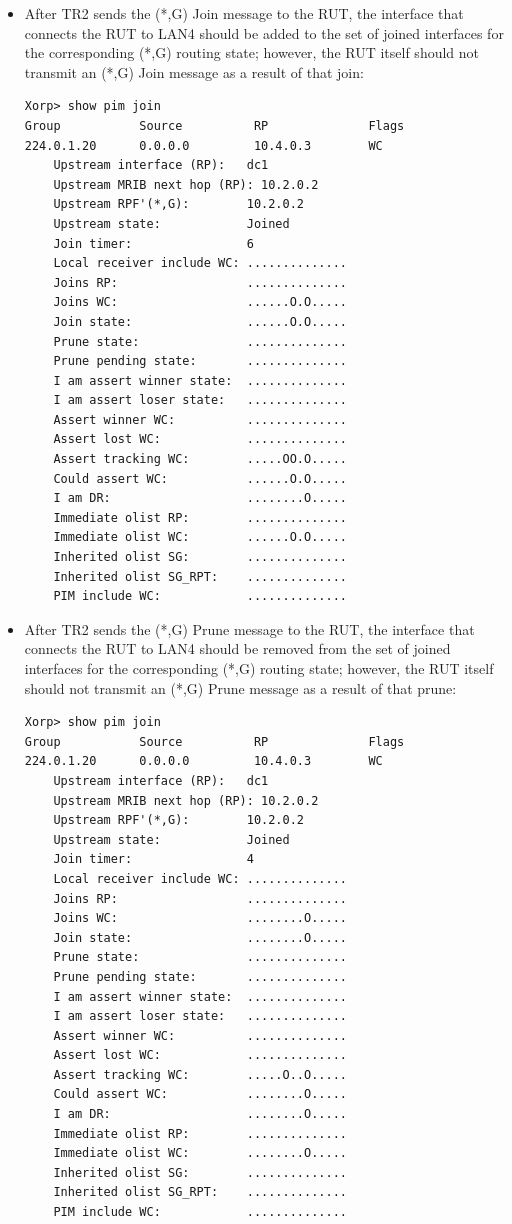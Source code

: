 \documentclass[11pt]{report}
\begin{document}
\begin{itemize}
  \item After TR2 sends the (*,G) Join message to the RUT, the interface
  that connects the RUT to LAN4 should be added to the set of joined
  interfaces for the corresponding (*,G) routing state; however, the RUT
  itself should not transmit an (*,G) Join message as a result of that
  join:

\begin{verbatim}
Xorp> show pim join
Group           Source          RP              Flags
224.0.1.20      0.0.0.0         10.4.0.3        WC   
    Upstream interface (RP):   dc1
    Upstream MRIB next hop (RP): 10.2.0.2
    Upstream RPF'(*,G):        10.2.0.2
    Upstream state:            Joined 
    Join timer:                6
    Local receiver include WC: ..............
    Joins RP:                  ..............
    Joins WC:                  ......O.O.....
    Join state:                ......O.O.....
    Prune state:               ..............
    Prune pending state:       ..............
    I am assert winner state:  ..............
    I am assert loser state:   ..............
    Assert winner WC:          ..............
    Assert lost WC:            ..............
    Assert tracking WC:        .....OO.O.....
    Could assert WC:           ......O.O.....
    I am DR:                   ........O.....
    Immediate olist RP:        ..............
    Immediate olist WC:        ......O.O.....
    Inherited olist SG:        ..............
    Inherited olist SG_RPT:    ..............
    PIM include WC:            ..............
\end{verbatim}

  \item After TR2 sends the (*,G) Prune message to the RUT, the interface
  that connects the RUT to LAN4 should be removed from the set of joined
  interfaces for the corresponding (*,G) routing state; however, the RUT
  itself should not transmit an (*,G) Prune message as a result of that
  prune:

\begin{verbatim}
Xorp> show pim join
Group           Source          RP              Flags
224.0.1.20      0.0.0.0         10.4.0.3        WC   
    Upstream interface (RP):   dc1
    Upstream MRIB next hop (RP): 10.2.0.2
    Upstream RPF'(*,G):        10.2.0.2
    Upstream state:            Joined 
    Join timer:                4
    Local receiver include WC: ..............
    Joins RP:                  ..............
    Joins WC:                  ........O.....
    Join state:                ........O.....
    Prune state:               ..............
    Prune pending state:       ..............
    I am assert winner state:  ..............
    I am assert loser state:   ..............
    Assert winner WC:          ..............
    Assert lost WC:            ..............
    Assert tracking WC:        .....O..O.....
    Could assert WC:           ........O.....
    I am DR:                   ........O.....
    Immediate olist RP:        ..............
    Immediate olist WC:        ........O.....
    Inherited olist SG:        ..............
    Inherited olist SG_RPT:    ..............
    PIM include WC:            ..............
\end{verbatim}


\end{itemize}
\end{document}
